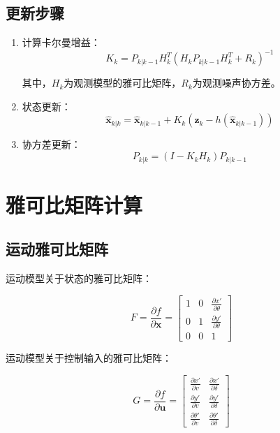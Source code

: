 \documentclass[12pt,a4paper]{report}
\begin{document}
\subsection{更新步骤}

\begin{enumerate}[itemsep=0pt]
    \item 计算卡尔曼增益：
    \begin{equation}
    K_k = P_{k|k-1} H_k^T (H_k P_{k|k-1} H_k^T + R_k)^{-1}
    \end{equation}
    
    其中，$H_k$为观测模型的雅可比矩阵，$R_k$为观测噪声协方差。
    
    \item 状态更新：
    \begin{equation}
    \hat{\mathbf{x}}_{k|k} = \hat{\mathbf{x}}_{k|k-1} + K_k (\mathbf{z}_k - h(\hat{\mathbf{x}}_{k|k-1}))
    \end{equation}
    
    \item 协方差更新：
    \begin{equation}
    P_{k|k} = (I - K_k H_k) P_{k|k-1}
    \end{equation}
\end{enumerate}

\section{雅可比矩阵计算}

\subsection{运动雅可比矩阵}

运动模型关于状态的雅可比矩阵：

\begin{equation}
F = \frac{\partial f}{\partial \mathbf{x}} = 
\begin{bmatrix}
1 & 0 & \frac{\partial x'}{\partial \theta} \\
0 & 1 & \frac{\partial y'}{\partial \theta} \\
0 & 0 & 1
\end{bmatrix}
\end{equation}

运动模型关于控制输入的雅可比矩阵：

\begin{equation}
G = \frac{\partial f}{\partial \mathbf{u}} = 
\begin{bmatrix}
\frac{\partial x'}{\partial v} & \frac{\partial x'}{\partial \delta} \\
\frac{\partial y'}{\partial v} & \frac{\partial y'}{\partial \delta} \\
\frac{\partial \theta'}{\partial v} & \frac{\partial \theta'}{\partial \delta}
\end{bmatrix}
\end{equation}
\end{document}
